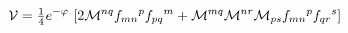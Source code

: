 \begin{equation}
 {\cal V} ={\textstyle \frac{1}{4}}e^{-\varphi}\,
             \left[ 2{\cal M}^{nq}f_{mn}{}^{p} f_{pq}{}^{m}
                  + {\cal M}^{mq}{\cal M}^{nr}{\cal M}_{ps}
                  f_{mn}{}^{p}f_{qr}{}^{s}
             \right]\, 
\end{equation}

